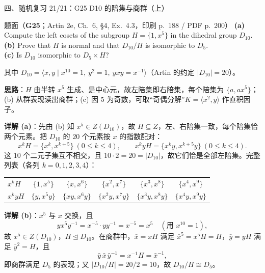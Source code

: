 \documentclass[aspectratio=169,10pt,fontset=none]{ctexbeamer}
\newcommand{\ex}[1]{\textcolor{accent}{\footnotesize\bfseries #1}}
\newcommand{\key}[1]{\textcolor{ink}{\bfseries #1}}
\begin{document}
\begin{frame}[t]{四、随机复习 21/21：G25 D10 的陪集与商群（上）}
\label{ex:G25}
\scriptsize
\begin{block}{\footnotesize 题面（\ex{G25}；Artin 2e, Ch.~6, §4, Ex.~4.3，印刷 p.~188 / PDF p.~200）}
\textbf{(a)} Compute the left cosets of the subgroup $H=\{1,x^5\}$ in the dihedral group $D_{10}$.\\
\textbf{(b)} Prove that $H$ is normal and that $D_{10}/H$ is isomorphic to $D_5$.\\
\textbf{(c)} Is $D_{10}$ isomorphic to $D_5\times H$?
\end{block}
其中 $D_{10}=\langle x,y\mid x^{10}=1,\ y^2=1,\ yxy=x^{-1}\rangle$（Artin 的约定 $|D_{10}|=20$）。

\key{思路}：$H$ 由半转 $x^5$ 生成、是中心元，故左陪集即右陪集，每个陪集为 $\{a,ax^5\}$；(b) 从群表现读出商群；(c) 因 $5$ 为奇数，可取“奇偶分解”$K=\langle x^2,y\rangle$ 作直积因子。

\key{详解 (a)}：先由 (b) 知 $x^5\in Z(D_{10})$，故 $H\subseteq Z$，左、右陪集一致，每个陪集恰两个元素。把 $D_{10}$ 的 $20$ 个元素按 $x$ 的指数配对：
\[ x^kH=\{x^k,x^{k+5}\}\ (0\le k\le4),\qquad x^kyH=\{x^ky,x^{k+5}y\}\ (0\le k\le4). \]
这 $10$ 个二元子集互不相交，且 $10\cdot2=20=|D_{10}|$，故它们恰是全部左陪集。完整列表（各列 $k=0,1,2,3,4$）：
\begin{center}
\begin{tabular}{@{}lccccc@{}}
\toprule
$x^kH$ & $\{1,x^5\}$ & $\{x,x^6\}$ & $\{x^2,x^7\}$ & $\{x^3,x^8\}$ & $\{x^4,x^9\}$\\
$x^kyH$ & $\{y,x^5y\}$ & $\{xy,x^6y\}$ & $\{x^2y,x^7y\}$ & $\{x^3y,x^8y\}$ & $\{x^4y,x^9y\}$\\
\bottomrule
\end{tabular}
\end{center}

\key{详解 (b)}：$x^5$ 与 $x$ 交换，且
\[ yx^5y^{-1}=x^{-5}\cdot y y^{-1}=x^{-5}=x^5\quad(\text{用 }x^{10}=1), \]
故 $x^5\in Z(D_{10})$，$H\trianglelefteq D_{10}$。在商群中，$\bar x=xH$ 满足 $\bar x^5=x^5H=H$，$\bar y=yH$ 满足 $\bar y^2=H$，且
\[ \bar y\,\bar x\,\bar y^{-1}=x^{-1}H=\bar x^{-1}, \]
即商群满足 $D_5$ 的表现；又 $|D_{10}/H|=20/2=10$，故 $D_{10}/H\cong D_5$。
\end{frame}
\end{document}
